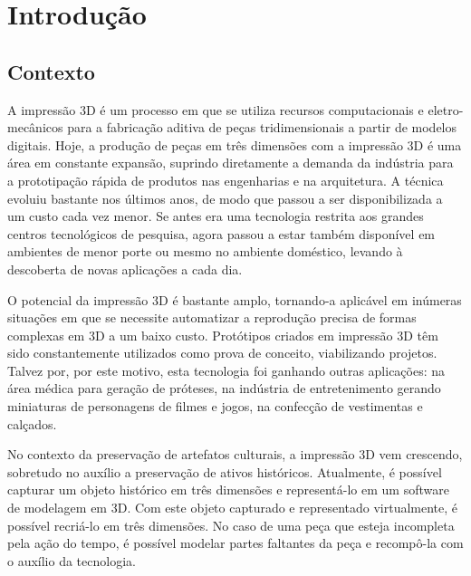 
\acresetall 

\section{Introdução}

\subsection{Contexto}

A impressão 3D é um processo em que se utiliza recursos computacionais e eletro-mecânicos para a fabricação aditiva de peças tridimensionais a partir de modelos digitais.
Hoje, a produção de peças em três dimensões com a impressão 3D é uma área em constante expansão, suprindo diretamente a demanda da indústria para a prototipação rápida de produtos nas engenharias e na arquitetura. A técnica evoluiu bastante nos últimos anos, de modo que passou a ser disponibilizada a um custo cada vez menor. Se antes era uma tecnologia restrita aos grandes centros tecnológicos de pesquisa, agora passou a estar também disponível em ambientes de menor porte ou mesmo no ambiente doméstico, levando à descoberta de novas aplicações a cada dia.

O potencial da impressão 3D é bastante amplo, tornando-a aplicável em inúmeras situações em que se necessite automatizar a reprodução precisa de formas complexas em 3D a um baixo custo. Protótipos criados em impressão 3D têm sido constantemente utilizados como prova de conceito, viabilizando projetos. Talvez por, por este motivo, esta tecnologia foi ganhando outras aplicações: na área médica para geração de próteses, na indústria de entretenimento gerando miniaturas de personagens de filmes e jogos, na confecção de vestimentas e calçados.

No contexto da preservação de artefatos culturais, a impressão 3D vem crescendo, sobretudo no auxílio a preservação de ativos históricos. Atualmente, é possível capturar um objeto histórico em três dimensões e representá-lo em um software de modelagem em 3D. Com este objeto capturado e representado virtualmente, é possível recriá-lo em três dimensões. No caso de uma peça que esteja incompleta pela ação do tempo, é possível modelar partes faltantes da peça e recompô-la com o auxílio da tecnologia.

